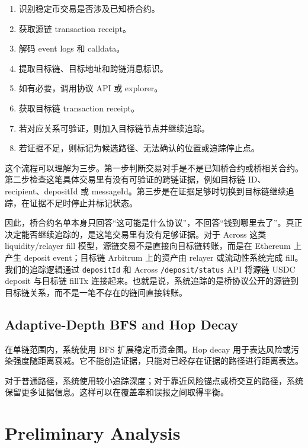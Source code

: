 \documentclass[12pt,a4paper]{ctexart}
\providecommand{\tightlist}{\setlength{\itemsep}{0pt}\setlength{\parskip}{0pt}}
\begin{document}
\begin{enumerate}
\def\labelenumi{\arabic{enumi}.}
\tightlist
\item
  识别稳定币交易是否涉及已知桥合约。
\item
  获取源链 transaction receipt。
\item
  解码 event logs 和 calldata。
\item
  提取目标链、目标地址和跨链消息标识。
\item
  如有必要，调用协议 API 或 explorer。
\item
  获取目标链 transaction receipt。
\item
  若对应关系可验证，则加入目标链节点并继续追踪。
\item
  若证据不足，则标记为候选路径、无法确认的位置或追踪停止点。
\end{enumerate}

这个流程可以理解为三步。第一步判断交易对手是不是已知桥合约或桥相关合约。第二步检查这笔具体交易里有没有可验证的跨链证据，例如目标链
ID、recipient、depositId 或 messageId。第三步是在证据足够时切换到目标链继续追踪，在证据不足时停止并标记状态。

因此，桥合约名单本身只回答``这可能是什么协议''，不回答``钱到哪里去了''。真正决定能否继续追踪的，是这笔交易里有没有足够证据。对于 Across 这类 liquidity/relayer fill
模型，源链交易不是直接向目标链转账，而是在 Ethereum 上产生 deposit
event；目标链 Arbitrum 上的资产由 relayer 或流动性系统完成
fill。我们的追踪逻辑通过 \texttt{depositId} 和 Across
\texttt{/deposit/status} API 将源链 USDC deposit 与目标链 fillTx
连接起来。也就是说，系统追踪的是桥协议公开的源链到目标链关系，而不是一笔不存在的链间直接转账。

\hypertarget{adaptive-depth-bfs-and-hop-decay}{%
\subsection{Adaptive-Depth BFS and Hop
Decay}\label{adaptive-depth-bfs-and-hop-decay}}

在单链范围内，系统使用 BFS 扩展稳定币资金图。Hop decay
用于表达风险或污染强度随距离衰减。它不能创造证据，只能对已经存在证据的路径进行距离表达。

对于普通路径，系统使用较小追踪深度；对于靠近风险锚点或桥交互的路径，系统保留更多证据信息。这样可以在覆盖率和误报之间取得平衡。

\hypertarget{preliminary-analysis}{%
\section{Preliminary Analysis}\label{preliminary-analysis}}
\end{document}
